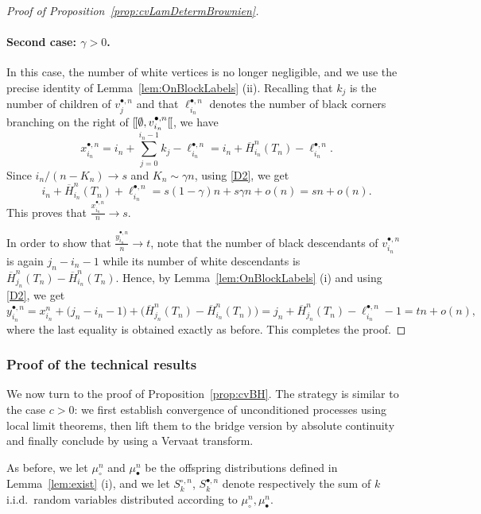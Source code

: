 \documentclass[10pt]{amsart}
\theoremstyle{definition}\newtheorem{defi}[theo]{Definition}\newtheorem{rema}[theo]{Remark}\newtheorem{exam}[theo]{Example}\newtheorem{exem}[theo]{Example}\newtheorem{nota}[theo]{Notation}
\def\mubn{\mu_{\bullet}^{n}}
\def\mucn{\mu_{\circ}^{n}}
\def\Sbn{S^{\bullet,n}}
\def\Scn{S^{\circ,n}}
\def\oH{\overline{H}}
\def\llbracket{[\hspace{-.10em} [ }
\begin{document}
\begin{proof}[Proof of Proposition~\ref{prop:cvLamDetermBrownien}]
\paragraph*{Second case: $\gamma>0$.} In this case, the number of white vertices is no longer negligible, and we use the precise identity of   Lemma~\ref{lem:OnBlockLabels} (ii). Recalling that $k_j$ is the number of children of $v^{\bullet,n}_j$
and that $\ell_{i_{n}}^{\bullet,n}$ denotes the number of black corners
branching on the right of  $\llbracket \emptyset, v^{\bullet,n}_{i_{n}} \llbracket$,
we have
 \begin{equation}
 \label{eq:est1}x^{\bullet,n}_{i_{n}}= i_{n}+\sum_{j=0}^{i_{n}-1} k_{j} - \ell_{i_{n}}^{\bullet,n}=i_{n}+\oH^{n}_{i_{n}}(T_{n})- \ell_{i_{n}}^{\bullet,n}.
 \end{equation}
Since $i_{n}/(n-K_{n}) \rightarrow s$ and $K_{n} \sim \gamma n$,  using \ref{D2}, we get
\begin{equation}
\label{eq:est2}i_{n}+ \oH^{n}_{i_{n}}(T_{n})+ \ell_{i_{n}}^{\bullet,n}=  s(1-\gamma) n + s \gamma n + o(n)=sn+o(n).
\end{equation}
This proves that $\tfrac{x^{\bullet,n}_{i_{n}}}{n} \rightarrow s$.

 In order to show that $\tfrac{y ^{\bullet,n}_{i_{n}}}{n} \rightarrow t$, note that the number of black descendants of $v^{\bullet,n}_{i_{n}}$ is again $j_{n}-i_{n}-1$ while its number of white descendants is $\oH^{n}_{j_{n}}(T_{n})-\oH^{n}_{i_{n}}(T_{n})$. Hence, by Lemma~\ref{lem:OnBlockLabels} (i) and using \ref{D2}, we get
 \[y ^{\bullet,n}_{i_{n}}=x ^{n}_{i_{n}}+\big(j_{n}-i_{n}-1\big)+\big(\oH^{n}_{j_{n}}(T_{n})-\oH^{n}_{i_{n}}(T_{n})\big)=j_{n}+\oH^{n}_{j_{n}}(T_{n})- \ell_{i_{n}}^{\bullet,n}-1= tn+o(n),\]
where the last equality is obtained exactly as before. This completes the proof.
\end{proof}


\subsubsection{Proof of the technical results}
\label{ssec:technical}

We now turn to the proof of Proposition~\ref{prop:cvBH}.
The strategy is similar to the case $c>0$: we first establish convergence of unconditioned processes using local limit theorems, then lift them to the bridge version by absolute continuity and finally conclude by using a Vervaat transform.

 As before, we let
$\mucn$ and $\mubn$ be the offspring distributions defined in Lemma~\ref{lem:exist} (i), and we let $\Scn_{k}$, $\Sbn_{k}$ denote respectively the sum of $k$ i.i.d.~random variables distributed according to $\mucn,\mubn$.
\end{document}
